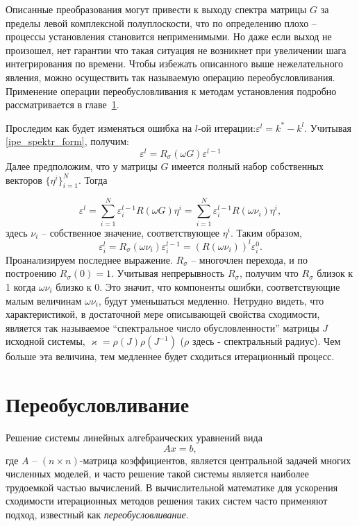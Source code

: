 \documentclass[a4paper,14pt]{extreport}
\begin{document}
Описанные преобразования могут привести к выходу спектра матрицы $G$ за пределы левой комплексной полуплоскости, что по определению плохо – процессы установления становится неприменимыми. Но даже если выход не произошел, нет гарантии что такая ситуация не возникнет при увеличении шага интегрирования по
времени. Чтобы избежать описанного выше нежелательного явления, можно осуществить так называемую операцию переобусловливания. Применение операции переобусловливания к методам установления подробно рассматривается  в главе~\ref{s:precond}.

Проследим как будет изменяться ошибка на $l$-ой итерации:$\varepsilon^l= k^* - k^l$. Учитывая \eqref{ipe_spektr_form}, получим:
	$$\varepsilon^l = R_\sigma (\omega G)\varepsilon^{l-1}$$
Далее предположим, что у матрицы $G$ имеется полный набор собственных векторов $\{\eta^i\}_{i=1}^N$. Тогда

	$$ \varepsilon^l = \sum_{i = 1}^{N}\varepsilon_i^{l-1}R(\omega G) \eta^i = 		\sum_{i=1}^{N}\varepsilon_i^{l-1}R(\omega \nu_i )\eta^i,$$
здесь $\nu_i$ -- собственное значение, соответствующее $\eta^i$. Таким образом,%
	$$ \varepsilon_i^l = R_\sigma(\omega \nu_i) \varepsilon_i^{l-1} = (R(\omega \nu_i))^l\varepsilon_i^0.$$
Проанализируем последнее выражение. $R_\sigma$ -- многочлен перехода, и по построению $R_\sigma(0) = 1$. Учитывая непрерывность $R_\sigma$, получим что $R_\sigma$ близок к 1 когда $\omega \nu_i$ близко к 0. Это значит, что компоненты ошибки, соответствующие малым величинам $\omega \nu_i$, будут уменьшаться медленно. Нетрудно видеть, что характеристикой,  в достаточной мере описывающей свойства сходимости, является так называемое ``спектральное число обусловленности'' матрицы $J$ исходной системы, $\varkappa = \rho(J) \rho(J^{-1})$ ($\rho$ здесь - спектральный радиус). Чем больше эта величина, тем медленнее будет сходиться итерационный процесс.
  
  \section{Переобусловливание}
  \label{s:precond}
  Решение системы линейных алгебраических уравнений вида
  \begin{equation}
	\label{slau}
	Ax=b,
	\end{equation}
 где $A$ -- $(n \times n)$-матрица коэффициентов, является центральной задачей многих численных моделей, и часто решение такой системы является наиболее трудоемкой частью вычислений. В вычислительной математике для ускорения сходимости итерационных методов решения таких систем часто применяют подход, известный как \textit{переобусловливание}. 
	
\end{document}

